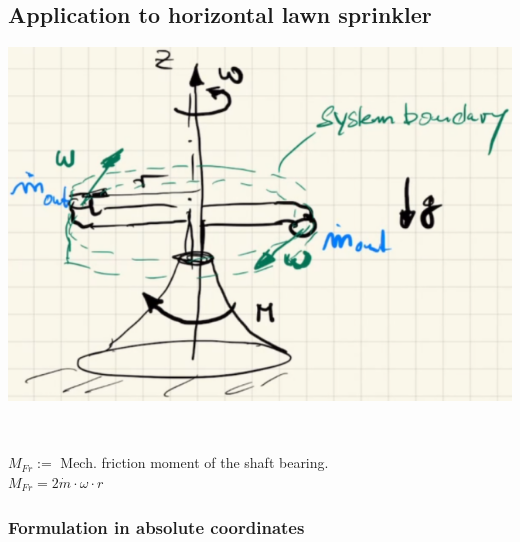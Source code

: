 \documentclass{article}
\begin{document}
\subsection{Application to horizontal lawn sprinkler}
\begin{minipage}{.5\textwidth}
    \begin{center}
        \includegraphics[width=.85\textwidth]{media/sprinkler.png}
    \end{center}
\end{minipage}
\hfill
\begin{minipage}{.5\textwidth}
    \begin{center}
        \\[2ex]
    \end{center}
    $M_{Fr} :=$ Mech. friction moment of the shaft bearing.\\
    $M_{Fr} = 2\dot{m}\cdot \omega \cdot r$
\end{minipage}

\subsubsection{Formulation in absolute coordinates}
\begin{center}
\end{center}
\end{document}
